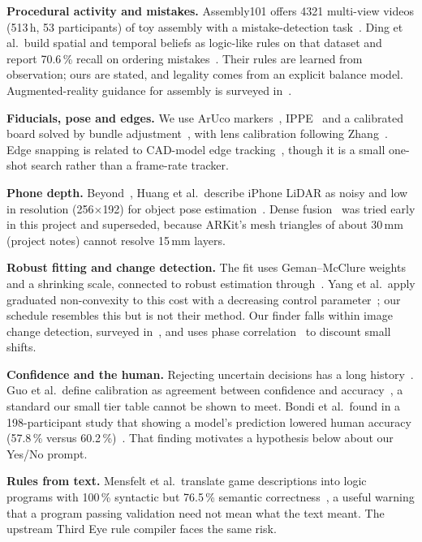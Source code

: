 \documentclass[conference,10pt]{IEEEtran}
\begin{document}
\textbf{Procedural activity and mistakes.} Assembly101 offers 4321 multi-view videos (513\,h, 53 participants) of toy assembly with a mistake-detection task~\cite{sener2022}. Ding et al.\ build spatial and temporal beliefs as logic-like rules on that dataset and report 70.6\,\% recall on ordering mistakes~\cite{ding2023}. Their rules are learned from observation; ours are stated, and legality comes from an explicit balance model. Augmented-reality guidance for assembly is surveyed in~\cite{wang2016}.

\textbf{Fiducials, pose and edges.} We use ArUco markers~\cite{garrido2014}, IPPE~\cite{collins2014} and a calibrated board solved by bundle adjustment~\cite{triggs2000}, with lens calibration following Zhang~\cite{zhang2000}. Edge snapping is related to CAD-model edge tracking~\cite{drummond2002}, though it is a small one-shot search rather than a frame-rate tracker.

\textbf{Phone depth.} Beyond~\cite{luetzenburg2021}, Huang et al.\ describe iPhone LiDAR as noisy and low in resolution (256$\times$192) for object pose estimation~\cite{huang2023}. Dense fusion~\cite{newcombe2011} was tried early in this project and superseded, because ARKit's mesh triangles of about 30\,mm (project notes) cannot resolve 15\,mm layers.

\textbf{Robust fitting and change detection.} The fit uses Geman--McClure weights and a shrinking scale, connected to robust estimation through~\cite{black1996}. Yang et al.\ apply graduated non-convexity to this cost with a decreasing control parameter~\cite{yang2020}; our schedule resembles this but is not their method. Our finder falls within image change detection, surveyed in~\cite{radke2005}, and uses phase correlation~\cite{kuglin1975} to discount small shifts.

\textbf{Confidence and the human.} Rejecting uncertain decisions has a long history~\cite{chow1970}. Guo et al.\ define calibration as agreement between confidence and accuracy~\cite{guo2017}, a standard our small tier table cannot be shown to meet. Bondi et al.\ found in a 198-participant study that showing a model's prediction lowered human accuracy (57.8\,\% versus 60.2\,\%)~\cite{bondi2022}. That finding motivates a hypothesis below about our Yes/No prompt.

\textbf{Rules from text.} Mensfelt et al.\ translate game descriptions into logic programs with 100\,\% syntactic but 76.5\,\% semantic correctness~\cite{mensfelt2025}, a useful warning that a program passing validation need not mean what the text meant. The upstream Third Eye rule compiler faces the same risk.
\end{document}
